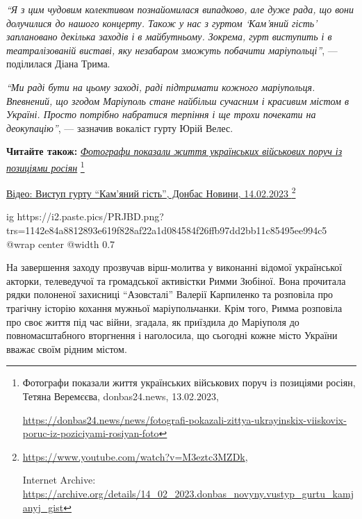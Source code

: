 \begin{leftbar}
\emph{\enquote{Я з цим чудовим колективом познайомилася випадково, але дуже рада, що вони
долучилися до нашого концерту. Також у нас з гуртом \enquote{Кам'яний гість}
заплановано декілька заходів і в майбутньому. Зокрема, гурт виступить і
в театралізованій виставі, яку незабаром зможуть побачити маріупольці}},
— поділилася Діана Трима.
\end{leftbar}

\begin{leftbar}
\emph{\enquote{Ми раді бути на цьому заході, раді підтримати кожного маріупольця. Впевнений,
що згодом Маріуполь стане найбільш сучасним і красивим містом в Україні. Просто
потрібно набратися терпіння і ще трохи почекати на деокупацію}}, — зазначив
вокаліст гурту Юрій Велес.
\end{leftbar}

\textbf{Читайте також:} \href{https://donbas24.news/news/fotografi-pokazali-zittya-ukrayinskix-viiskovix-poruc-iz-poziciyami-rosiyan-foto}{\emph{Фотографи показали життя українських військових поруч із позиціями росіян}}%
\footnote{Фотографи показали життя українських військових поруч із позиціями росіян, Тетяна Веремєєва, donbas24.news, 13.02.2023, \par%
\url{https://donbas24.news/news/fotografi-pokazali-zittya-ukrayinskix-viiskovix-poruc-iz-poziciyami-rosiyan-foto}%
}


\href{https://archive.org/details/14_02_2023.donbas_novyny.vustyp_gurtu_kamjanyj_gist}{%
Відео: Виступ гурту \enquote{Кам'яний гість}, Донбас Новини, 14.02.2023%
}%
\footnote{\url{https://www.youtube.com/watch?v=M3eztc3MZDk}, \par
Internet Archive: \url{https://archive.org/details/14_02_2023.donbas_novyny.vustyp_gurtu_kamjanyj_gist}}

\ifcmt
  ig https://i2.paste.pics/PRJBD.png?trs=1142e84a8812893e619f828af22a1d084584f26ffb97dd2bb11c85495ee994c5
  @wrap center
  @width 0.7
\fi

На завершення заходу прозвучав вірш-молитва у виконанні відомої української
акторки, телеведучої та громадської активістки Римми Зюбіної. Вона прочитала
рядки полоненої захисниці \enquote{Азовсталі} Валерії Карпиленко та розповіла про
трагічну історію кохання мужньої маріупольчанки. Крім того, Римма розповіла про
своє життя під час війни, згадала, як приїздила до Маріуполя до
повномасштабного вторгнення і наголосила, що сьогодні кожне місто України
вважає своїм рідним містом.

